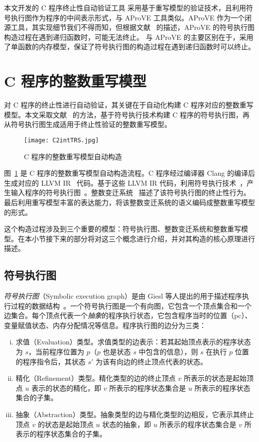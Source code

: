 本文开发的 C 程序终止性自动验证工具 \CTerm 采用基于重写模型的验证技术，且利用符号执行图作为程序的中间表示形式，与 AProVE 工具类似。AProVE 作为一个闭源工具，其实现细节我们不得而知，但根据文献~ 的描述，AProVE 的符号执行图构造过程在遇到递归函数时，可能无法终止。   \CTerm 与 AProVE 的主要区别在于，\CTerm 采用了单函数的内存模型，保证了符号执行图的构造过程在遇到递归函数时可以终止。


\section{C 程序的整数重写模型}
\label{s:termination-models}

对 C 程序的终止性进行自动验证，其关键在于自动化构建 C 程序对应的整数重写模型。本文采取文献~ 的方法，基于符号执行技术构建 C 程序的符号执行图，再从符号执行图生成适用于终止性验证的整数重写模型。

\begin{figure}[ht]
\centering
\texttt{[image: C2intTRS.jpg]}
\caption{C 程序的整数重写模型自动构造}
\label{f:C2intTRS}
\end{figure}

图~\ref{f:C2intTRS} 是 C 程序的整数重写模型自动构造流程。C 程序经过编译器 Clang 的编译后生成对应的 LLVM IR~\cite{DBLP:conf/cgo/LattnerA04} 代码。基于这些 LLVM IR 代码，利用符号执行技术~\cite{DBLP:journals/cacm/King76}，产生输入程序的符号执行图~\cite{DBLP:conf/lopstr/GieslSSEF12}。整数变迁系统~\cite{DBLP:journals/cacm/Keller76} 描述了该符号执行图的终止性行为。最后利用重写模型丰富的表达能力，将该整数变迁系统的语义编码成整数重写模型的形式。

这个构造过程涉及到三个重要的模型：符号执行图、整数变迁系统和整数重写模型。在本小节接下来的部分将对这三个概念进行介绍，并对其构造的核心原理进行描述。

\subsection{符号执行图}
\label{ss:seg}

\emph{符号执行图}（Symbolic execution graph）是由 Giesl 等人提出的用于描述程序执行过程的数据结构~\cite{DBLP:conf/lopstr/GieslSSEF12}。一个符号执行图是一个有向图，它包含一个顶点集合和一个边集合。每个顶点代表一个\emph{抽象}的程序执行状态，它包含程序当时的位置（pc）、变量赋值状态、内存分配情况等信息。程序执行图的边分为三类：
\begin{enumerate} [(i)]
\item 求值（Evaluation）类型。求值类型的边表示：若其起始顶点表示的程序状态为 $s$，当前程序位置为 $p$（$p$ 也是状态 $s$ 中包含的信息），则 $s$ 在执行 $p$ 位置的程序指令后，其状态 $s'$ 为该有向边的终止顶点代表的状态。
\item 精化（Refinement）类型。精化类型的边的终止顶点 $v$ 所表示的状态是起始顶点 $u$ 表示的状态的精化，即 $v$ 所表示的程序状态集合是 $u$ 所表示的程序状态集合的子集。
\item 抽象（Abstraction）类型。抽象类型的边与精化类型的边相反，它表示其终止顶点 $v$ 的状态是起始顶点 $u$ 状态的抽象，即 $u$ 所表示的程序状态集合是 $v$ 所表示的程序状态集合的子集。
\end{enumerate}

